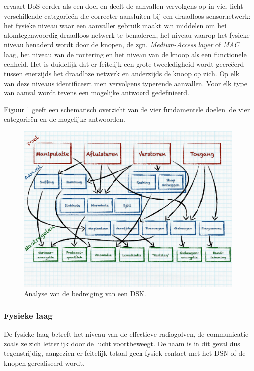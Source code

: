 \citep{aschenbruck2012security} ervaart DoS eerder als een doel en deelt de
aanvallen vervolgens op in vier licht verschillende categorie\"en die correcter
aansluiten bij een draadloos sensornetwerk: het fysieke niveau waar een
aanvaller gebruik maakt van middelen om het alomtegenwoordig draadloos netwerk
te benaderen, het niveau waarop het fysieke niveau benaderd wordt door de
knopen, de zgn. \emph{Medium-Access layer} of \emph{MAC} laag, het niveau van
de routering en het niveau van de knoop als een functionele eenheid. Het is
duidelijk dat er feitelijk een grote tweeledigheid wordt gecre\"eerd tussen
enerzijds het draadloze netwerk en anderzijds de knoop op zich. Op elk van deze
niveaus identificeert men vervolgens typerende aanvallen. Voor elk type van
aanval wordt tevens een mogelijke antwoord gedefinieerd.

Figuur \ref{fig:wsn-threat-analysis} geeft een schematisch overzicht van de
vier fundamentele doelen, de vier categorie\"en en de mogelijke antwoorden.

\begin{figure}[ht]
  \centering
  \includegraphics[width=0.9\linewidth]{resources/wsn-threat-analysis.pdf}
  \caption{Analyse van de bedreiging van een DSN.}
  \label{fig:wsn-threat-analysis}
\end{figure}

\subsubsection*{Fysieke laag}

De fysieke laag betreft het niveau van de effectieve radiogolven, de
communicatie zoals ze zich letterlijk door de lucht voortbeweegt. De naam is in
dit geval dus tegenstrijdig, aangezien er feitelijk totaal geen fysiek contact
met het DSN of de knopen gerealiseerd wordt.

